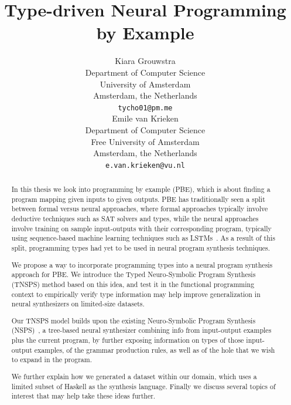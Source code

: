 \documentclass{article} %
\title{Type-driven Neural Programming by Example}
\author{
   Kiara Grouwstra
   \\
   Department of Computer Science \\
   University of Amsterdam\\
   Amsterdam, the Netherlands \\
   \texttt{tycho01@pm.me} \\
   \And
   Emile van Krieken \\
   Department of Computer Science \\
   Free University of Amsterdam\\
   Amsterdam, the Netherlands \\
   \texttt{e.van.krieken@vu.nl} \\
}
\begin{document}
% 


\maketitle




\tableofcontents


\begin{abstract}

   In this thesis we look into programming by example (PBE),
   which is about finding a program mapping given inputs to given outputs.
   PBE has traditionally seen a split between formal versus neural approaches,
   where formal approaches typically involve deductive techniques such as SAT solvers and types,
   while the neural approaches involve training on sample input-outputs with their corresponding program,
   typically using sequence-based machine learning techniques such as LSTMs~\citep{lstm}.
   As a result of this split, programming types had yet to be used in neural program synthesis techniques.

   We propose a way to incorporate programming types into a neural program synthesis approach for PBE.
   We introduce the Typed Neuro-Symbolic Program Synthesis (TNSPS) method based on this idea,
   and test it in the functional programming context to empirically verify type information
   may help improve generalization in neural synthesizers on limited-size datasets.

   Our TNSPS model builds upon the existing Neuro-Symbolic Program Synthesis (NSPS)~\citep{nsps},
   a tree-based neural synthesizer combining info from input-output examples plus the current program,
   by further exposing information on types of those input-output examples,
   of the grammar production rules, as well as of the hole that we wish to expand in the program.

   We further explain how we generated a dataset within our domain,
   which uses a limited subset of Haskell as the synthesis language.
   Finally we discuss several topics of interest that may help take these ideas further.

\end{abstract}
\end{document}
